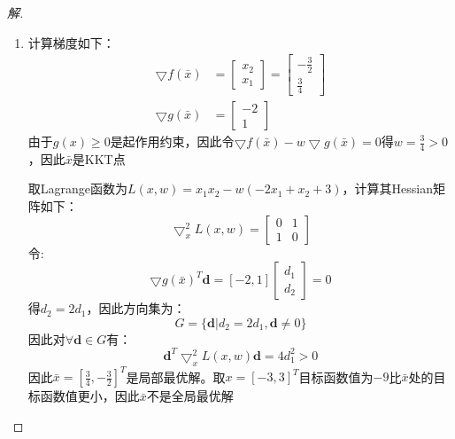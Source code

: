 \documentclass[a4paper,12pt]{article}
\begin{document}
\begin{proof}[解]
	\begin{enumerate}[(1)]
		\item 计算梯度如下：
		\begin{equation}
		\begin{aligned}
		\bigtriangledown f(\bar{x})&=\left[
		\begin{array}{c}
		x_2 \\
		x_1
		\end{array}
		\right]=\left[
		\begin{array}{c}
		-\frac{3}{2} \\
		\frac{3}{4}
		\end{array}
		\right]\\
		\bigtriangledown g(\bar{x})&=\left[
		\begin{array}{c}
		-2 \\
		1
		\end{array}
		\right]
		\end{aligned}
		\end{equation}
		由于$g(x)\ge 0$是起作用约束，因此令$\bigtriangledown f(\bar{x})-w\bigtriangledown g(\bar{x})=0$得$w=\frac{3}{4}>0$，因此$\bar{x}$是KKT点
		
		取Lagrange函数为$L(x,w)=x_1x_2-w(-2x_1+x_2+3)$，计算其Hessian矩阵如下：
		\begin{equation}
		\bigtriangledown^2_x L(x,w)=\left[
		\begin{array}{cc}
		0 & 1 \\
		1 & 0
		\end{array}
		\right]
		\end{equation}
		令:
		\begin{equation}
		\bigtriangledown g(\bar{x})^T\mathbf{d}=[-2,1]\left[
		\begin{array}{c}
		d_1 \\
		d_2
		\end{array}
		\right]=0
		\end{equation}
		得$d_2=2d_1$，因此方向集为：
		\begin{equation}
		G=\{\mathbf{d}|d_2=2d_1,\mathbf{d}\ne 0\}
		\end{equation}
		因此对$\forall \mathbf{d}\in G$有：
		\begin{equation}
		\mathbf{d}^T\bigtriangledown^2_x L(x,w)\mathbf{d}=4d_1^2>0
		\end{equation}
		因此$\bar{x}=\left[\frac{3}{4},-\frac{3}{2}\right]^T$是局部最优解。取$x=[-3,3]^T$目标函数值为$-9$比$\bar{x}$处的目标函数值更小，因此$\bar{x}$不是全局最优解
		

\end{enumerate}
\end{proof}
\end{document}
